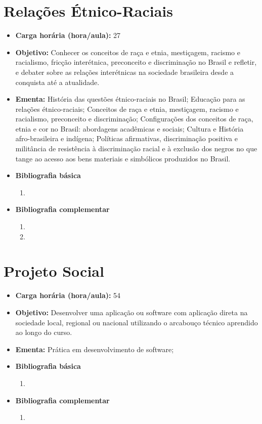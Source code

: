 \documentclass[11pt,fleqn]{book} %
\begin{document}
\section{Relações Étnico-Raciais}\label{4_etnicoraciais}
\begin{itemize}
	\item \textbf{Carga horária (hora/aula):} 27
	\item \textbf{Objetivo:} Conhecer os conceitos de raça e etnia, mestiçagem, racismo e racialismo, fricção interétnica, preconceito e discriminação no Brasil e refletir, e debater sobre as relações interétnicas na sociedade brasileira desde a conquista até a atualidade.
	\item \textbf{Ementa:} 
	História das questões étnico-raciais no Brasil;
	Educação para as relações étnico-raciais;
	Conceitos de raça e etnia, mestiçagem, racismo e racialismo, preconceito e discriminação;
	Configurações dos conceitos de raça, etnia e cor no Brasil: abordagens acadêmicas e sociais;
	Cultura e História afro-brasileira e indígena;
	Políticas afirmativas, discriminação positiva e militância de resistência à discriminação racial e à exclusão dos negros no que tange ao acesso aos bens materiais e simbólicos produzidos no Brasil.
	\item \textbf{Bibliografia básica}
	\begin{enumerate}
		\item 
	\end{enumerate}
	\item \textbf{Bibliografia complementar}
	\begin{enumerate}
		\item
		\item 
	\end{enumerate}
\end{itemize}

\newpage
\section{Projeto Social}\label{4_projsoc}
\begin{itemize}
	\item \textbf{Carga horária (hora/aula):} 54
	\item \textbf{Objetivo:} Desenvolver uma aplicação ou software com aplicação direta na sociedade local, regional ou nacional utilizando o arcabouço técnico aprendido ao longo do curso.
	\item \textbf{Ementa:} 
	Prática em desenvolvimento de software;
	\item \textbf{Bibliografia básica}
	\begin{enumerate}
		\item 
	\end{enumerate}
	\item \textbf{Bibliografia complementar}
	\begin{enumerate}
		\item 	
	\end{enumerate}	
\end{itemize}
\end{document}
